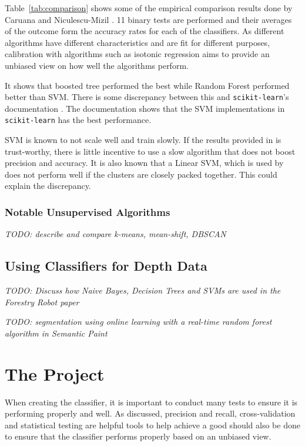 \documentclass[11pt,openright,a4paper]{report}
\begin{document}
Table~\ref{tab:comparison} shows some of the empirical comparison results done by Caruana and Niculescu-Mizil \cite{compare-supervised}. 11 binary tests are performed and their averages of the outcome form the accuracy rates for each of the classifiers. As different algorithms have different characteristics and are fit for different purposes, calibration with algorithms such as isotonic regression aims to provide an unbiased view on how well the algorithms perform.

It shows that boosted tree performed the best while Random Forest performed better than SVM. There is some discrepancy between this and \texttt{scikit-learn}'s documentation \cite{scikit-docs-supervised-compare}. The documentation shows that the SVM implementations in \texttt{scikit-learn} has the best performance. 

SVM is known to not scale well and train slowly. If the results provided in \cite{compare-supervised} is trust-worthy, there is little incentive to use a slow algorithm that does not boost precision and accuracy. It is also known that a Linear SVM, which is used by \cite{compare-supervised} does not perform well if the clusters are closely packed together. This could explain the discrepancy.

\subsection{Notable Unsupervised Algorithms}
\textit{TODO: describe and compare k-means, mean-shift, DBSCAN}


\section{Using Classifiers for Depth Data}
\textit{TODO: Discuss how Naive Bayes, Decision Trees and SVMs are used in the Forestry Robot paper \cite{forestry}}

\textit{TODO: segmentation using online learning with a real-time random forest algorithm in Semantic Paint \cite{semantic-paint}}

\newpage

\chapter{The Project}
When creating the classifier, it is important to conduct many tests to ensure it is performing properly and well. As discussed, precision and recall, cross-validation and statistical testing are helpful tools to help achieve a good should also be done to ensure that the classifier performs properly based on an unbiased view. 
\end{document}
